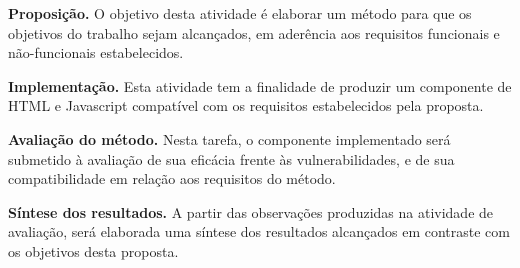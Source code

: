 \begin{alineas}
	\item \textbf{Proposição.}
	O objetivo desta atividade é elaborar um método para que os objetivos do trabalho sejam alcançados, em aderência aos requisitos funcionais e não-funcionais estabelecidos.

	\item \textbf{Implementação.}
	Esta atividade tem a finalidade de produzir um componente de HTML e Javascript compatível com os requisitos estabelecidos pela proposta.
		
	\item\textbf{Avaliação do método.}
	Nesta tarefa, o componente implementado será submetido à avaliação de sua eficácia frente às vulnerabilidades, e de sua compatibilidade em relação aos requisitos do método.
	
	\item \textbf{Síntese dos resultados.}
	A partir das observações produzidas na atividade de avaliação, será elaborada uma síntese dos resultados alcançados em contraste com os objetivos desta proposta.
\end{alineas}

